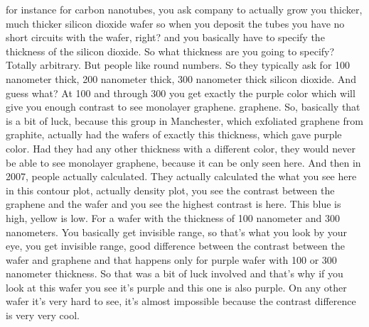 for instance for carbon nanotubes, you ask company to actually grow you thicker, much thicker silicon dioxide wafer so when you deposit the tubes you have no short circuits with the wafer, right? and you basically have to specify the thickness of the silicon dioxide. So what thickness are you going to specify? Totally arbitrary. But people like round numbers. So they typically ask for 100 nanometer thick, 200 nanometer thick, 300 nanometer thick silicon dioxide. And guess what? At 100 and through 300 you get exactly the purple color which will give you enough contrast to see monolayer graphene. graphene. So, basically that is a bit of luck, because this group in Manchester, which exfoliated graphene from graphite, actually had the wafers of exactly this thickness, which gave purple color. Had they had any other thickness with a different color, they would never be able to see monolayer graphene, because it can be only seen here. And then in 2007, people actually calculated. They actually calculated the what you see here in this contour plot, actually density plot, you see the contrast between the graphene and the wafer and you see the highest contrast is here. This blue is high, yellow is low. For a wafer with the thickness of 100 nanometer and 300 nanometers. You basically get invisible range, so that's what you look by your eye, you get invisible range, good difference between the contrast between the wafer and graphene and that happens only for purple wafer with 100 or 300 nanometer thickness. So that was a bit of luck involved and that's why if you look at this wafer you see it's purple and this one is also purple. On any other wafer it's very hard to see, it's almost impossible because the contrast difference is very very cool.
